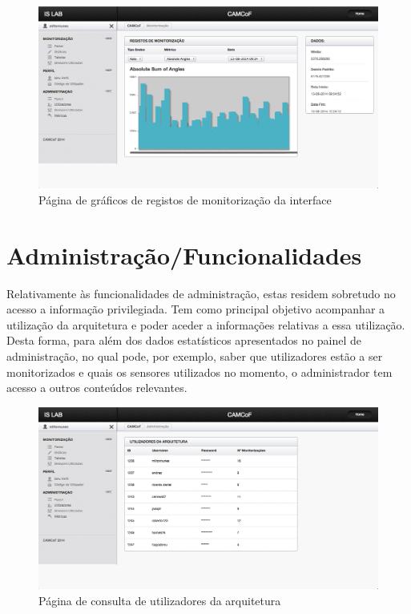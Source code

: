  \begin{figure}[htb]
   \centering
   \includegraphics[scale=0.29]{Images/graphs.png}
   \caption{Página de gráficos de registos de monitorização da interface}
\end{figure}


\section{Administração/Funcionalidades}

Relativamente às funcionalidades de administração, estas residem sobretudo no acesso a informação privilegiada. Tem como principal objetivo acompanhar a utilização da arquitetura e poder aceder a informações relativas a essa utilização. Desta forma, para além dos dados estatísticos apresentados no painel de administração, no qual pode, por exemplo, saber que utilizadores estão a ser monitorizados e quais os sensores utilizados no momento, o administrador tem acesso a outros conteúdos relevantes.

\begin{figure}[htb]
   \centering
   \includegraphics[scale=0.29]{Images/users.png}
   \caption{Página de consulta de utilizadores da arquitetura}
\end{figure}

